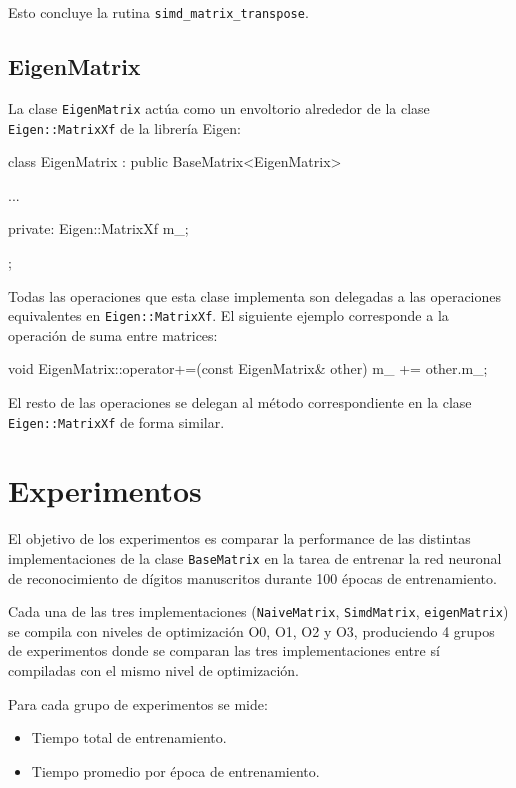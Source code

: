 \documentclass[a4paper, 10pt, twoside]{article}
\newcommand{\cc}[1]{\texttt{#1}}
\begin{document}
Esto concluye la rutina \cc{simd\_matrix\_transpose}.


\subsection{EigenMatrix}

La clase \cc{EigenMatrix} actúa como un envoltorio alrededor de la clase
\cc{Eigen::MatrixXf} de la librería Eigen:

\begin{code}
class EigenMatrix : public BaseMatrix<EigenMatrix> {
  ...

 private:
  Eigen::MatrixXf m_;
};
\end{code}

Todas las operaciones que esta clase implementa son delegadas a las operaciones
equivalentes en \cc{Eigen::MatrixXf}. El siguiente ejemplo corresponde a la
operación de suma entre matrices:

\begin{code}
  void EigenMatrix::operator+=(const EigenMatrix& other) {
    m_ += other.m_;
  }
\end{code}

El resto de las operaciones se delegan al método correspondiente en la clase
\cc{Eigen::MatrixXf} de forma similar.




\section{Experimentos}

El objetivo de los experimentos es comparar la performance de las distintas
implementaciones de la clase \cc{BaseMatrix} en la tarea de entrenar la red
neuronal de reconocimiento de dígitos manuscritos durante 100 épocas de
entrenamiento.

Cada una de las tres implementaciones (\cc{NaiveMatrix}, \cc{SimdMatrix},
\cc{eigenMatrix}) se compila con niveles de optimización O0, O1, O2 y O3,
produciendo 4 grupos de experimentos donde se comparan las tres
implementaciones entre sí compiladas con el mismo nivel de optimización.

Para cada grupo de experimentos se mide:

\begin{itemize}
  \item Tiempo total de entrenamiento.
  \item Tiempo promedio por época de entrenamiento.
\end{itemize}
\end{document}
